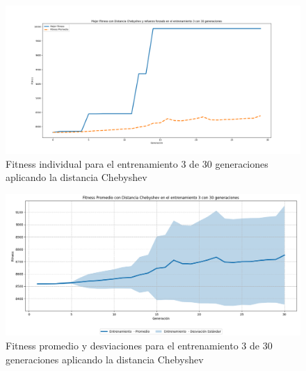 \documentclass[conference]{IEEEtran}
\begin{document}
\begin{figure}[H]
    \centering
    \includegraphics[width=0.9 \linewidth]{Chebyshev/Fitness_individual_30Gen/Fitness_3_Cheby_30Gen.png}
    \caption{Fitness individual para el entrenamiento 3 de 30 generaciones aplicando la distancia Chebyshev}
    \label{fig:cheb_3_30}
\end{figure}
\begin{figure}[H]
    \centering
    \includegraphics[width=0.9 \linewidth]{Chebyshev/Fitness_individual_30Gen/Fitness_3_Cheby_30Gen_Sombra.png}
    \caption{Fitness promedio y desviaciones para el entrenamiento 3 de 30 generaciones aplicando la distancia Chebyshev}
    \label{fig:cheb_3_30_sombra}
\end{figure}
\end{document}
